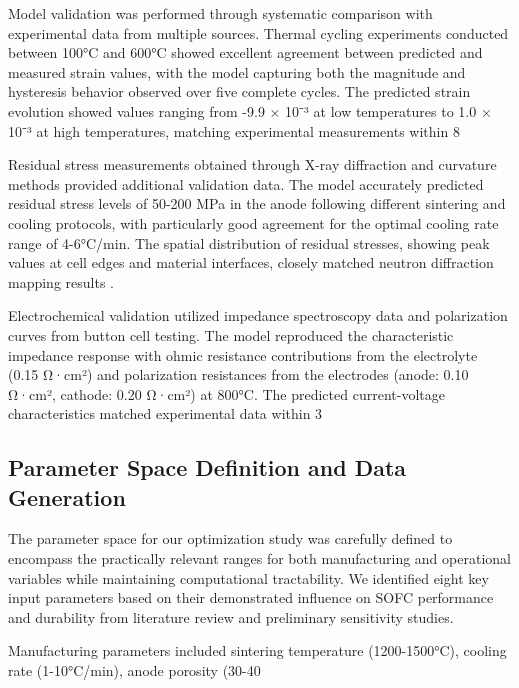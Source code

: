 \documentclass[conference]{IEEEtran}
\begin{document}
Model validation was performed through systematic comparison with experimental data from multiple sources. Thermal cycling experiments conducted between 100°C and 600°C showed excellent agreement between predicted and measured strain values, with the model capturing both the magnitude and hysteresis behavior observed over five complete cycles. The predicted strain evolution showed values ranging from -9.9 × 10⁻³ at low temperatures to 1.0 × 10⁻³ at high temperatures, matching experimental measurements within 8%

Residual stress measurements obtained through X-ray diffraction and curvature methods provided additional validation data. The model accurately predicted residual stress levels of 50-200 MPa in the anode following different sintering and cooling protocols, with particularly good agreement for the optimal cooling rate range of 4-6°C/min. The spatial distribution of residual stresses, showing peak values at cell edges and material interfaces, closely matched neutron diffraction mapping results \cite{todd2024residual}.

Electrochemical validation utilized impedance spectroscopy data and polarization curves from button cell testing. The model reproduced the characteristic impedance response with ohmic resistance contributions from the electrolyte (0.15 Ω·cm²) and polarization resistances from the electrodes (anode: 0.10 Ω·cm², cathode: 0.20 Ω·cm²) at 800°C. The predicted current-voltage characteristics matched experimental data within 3%

\subsection{Parameter Space Definition and Data Generation}

The parameter space for our optimization study was carefully defined to encompass the practically relevant ranges for both manufacturing and operational variables while maintaining computational tractability. We identified eight key input parameters based on their demonstrated influence on SOFC performance and durability from literature review and preliminary sensitivity studies.

Manufacturing parameters included sintering temperature (1200-1500°C), cooling rate (1-10°C/min), anode porosity (30-40%
\end{document}
